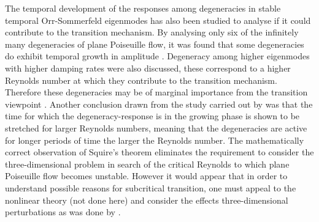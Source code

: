 \documentclass[a4paper, 12pt, twoside, openright]{article}
\numberwithin{equation}{section}
\begin{document}
The temporal development of the responses among degeneracies in stable temporal Orr-Sommerfeld eigenmodes has also been studied to analyse if it could contribute to the transition mechanism. By analysing only six of the infinitely many degeneracies of plane Poiseuille flow, it was found that some degeneracies do exhibit temporal growth in amplitude \citep{Shanthini89}. Degeneracy among higher eigenmodes with higher damping rates were also discussed, these correspond to a higher Reynolds number at which they contribute to the transition mechanism. Therefore these degeneracies may be of marginal importance from the transition viewpoint \citep{Shanthini89}. Another conclusion drawn from the study carried out by \cite{Shanthini89} was that the time for which the degeneracy-response is in the growing phase is shown to be stretched for larger Reynolds numbers, meaning that the degeneracies are active for longer periods of time the larger the Reynolds number. The mathematically correct observation of Squire's theorem eliminates the requirement to consider the three-dimensional problem in search of the critical Reynolds to which plane Poiseuille flow becomes unstable. However it would appear that in order to understand possible reasons for subcritical transition, one must appeal to the nonlinear theory (not done here) and consider the effects three-dimensional perturbations as was done by \cite{OrszagPatera83}. 
\end{document}

